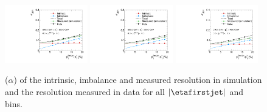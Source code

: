 \begin{figure}[!h]
    \includegraphics[width=0.32\textwidth]{figures/resolution/results/JER_for_1_eta_bin_9_pTGamma_bin_all_contributions_PFCHS_RMS99_mc.pdf}
    \includegraphics[width=0.32\textwidth]{figures/resolution/results/JER_for_1_eta_bin_10_pTGamma_bin_all_contributions_PFCHS_RMS99_mc.pdf}
    \includegraphics[width=0.32\textwidth]{figures/resolution/results/JER_for_1_eta_bin_11_pTGamma_bin_all_contributions_PFCHS_RMS99_mc.pdf}
  \caption{\jer($\alpha$) of the intrinsic, imbalance and measured resolution in simulation and the resolution measured in data for all $|\etafirstjet|$ and \ptgamma bins.}
  \label{fig:ExtrapolationPlots1}
\end{figure}

